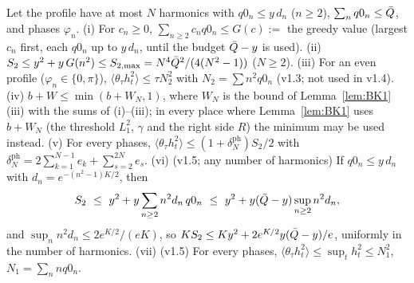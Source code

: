 \begin{lemma} \proofst
\label{lem:F1}
Let the profile have at most $N$ harmonics with $q0_n\le y\,d_n$ ($n\ge2$), $\sum_nq0_n\le\bar Q$, and phases $\varphi_n$.
(i) For $c_n\ge0$, $\sum_{n\ge2}c_nq0_n\le G(c):=$ the greedy value (largest $c_n$ first, each $q0_n$ up to $y\,d_n$, until the budget $\bar Q-y$ is used).
(ii) $S_2\le y^2+y\,G(n^2)\le S_{2,\max}=N^4\bar Q^2/(4(N^2-1))$ ($N\ge2$).
(iii) For an even profile ($\varphi_n\in\{0,\pi\}$), $\langle\theta_\tau h_t^2\rangle\le\tau N_2^2$ with $N_2=\sum n^2q0_n$ (v1.3; not used in v1.4).
(iv) $b+W\le\min(b+W_N,1)$, where $W_N$ is the bound of Lemma~\ref{lem:BK1}(iii) with the sums of (i)--(iii); in every place where Lemma~\ref{lem:BK1}
uses $b+W_N$ (the threshold $L_1^2$, $\gamma$ and the right side $R$) the minimum may be used instead.
(v) For every phases, $\langle\theta_\tau h_t^2\rangle\le(1+\delta_N^{\mathrm{ph}})S_2/2$ with $\delta_N^{\mathrm{ph}}=2\sum_{k=1}^{N-1}e_k+\sum_{s=2}^{2N}e_s$.
(vi) (v1.5; any number of harmonics) If $q0_n\le y\,d_n$ with $d_n=e^{-(n^2-1)K/2}$, then
\begin{equation*}
S_2\ \le\ y^2+y\sum_{n\ge2}n^2d_n\,q0_n\ \le\ y^2+y(\Qb-y)\sup_{n\ge2}n^2d_n ,
\end{equation*}
and $\sup_nn^2d_n\le2e^{K/2}/(eK)$, so $KS_2\le Ky^2+2e^{K/2}y(\bar Q-y)/e$, uniformly in the number of harmonics.
(vii) (v1.5) For every phases, $\langle\theta_\tau h_t^2\rangle\le\sup_th_t^2\le N_1^2$, $N_1=\sum_nnq0_n$.
\end{lemma}
